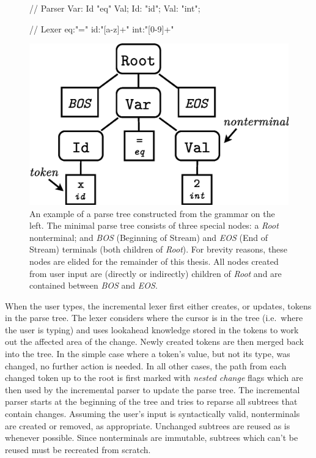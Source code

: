 \documentclass[sigplan,screen]{acmart}\settopmatter{printfolios=true,printccs=false,printacmref=false}
\begin{document}
\begin{figure}
\begin{minipage}[b]{0.17\textwidth}
\begin{lsteco}
// Parser
Var: Id "eq" Val;
Id: "id";
Val: "int";

// Lexer
eq:"="
id:"[a-z]+"
int:"[0-9]+"
\end{lsteco}
\end{minipage}
\begin{minipage}[b]{0.30\textwidth}
\includegraphics[width=1.0\textwidth]{images/sampleparsetree}
\end{minipage}
\caption{An example of a parse tree constructed from the grammar on the left.
The minimal parse tree consists of three
special nodes: a \emph{Root} nonterminal; and \emph{BOS} (Beginning of
Stream) and \emph{EOS} (End of Stream) terminals (both children of
\emph{Root}). For brevity reasons, these nodes are elided for the remainder of
this thesis. All nodes created from user input are (directly or indirectly)
children of \emph{Root} and are contained between \emph{BOS} and \emph{EOS}.}
\label{fig_example_parsetree}
\end{figure}

When the user types, the incremental lexer first either creates, or updates,
tokens in the parse tree. The lexer considers where the cursor is in the tree
(i.e.~where the user is typing) and uses lookahead knowledge stored in the
tokens to work out the affected area of the change. Newly created tokens are
then merged back into the tree.  In the simple case where a token's value, but
not its type, was changed, no further action is needed. In all other cases, the
path from each changed token up to the root is first marked with \textit{nested
change} flags which are then used by the incremental parser to update the parse
tree. The incremental parser starts at the beginning of the tree and tries to
reparse all subtrees that contain changes. Assuming the user's input is
syntactically valid, nonterminals are created or removed, as appropriate.
Unchanged subtrees are reused as is whenever possible. Since nonterminals are
immutable, subtrees which can't be reused must be recreated from scratch.
\end{document}
